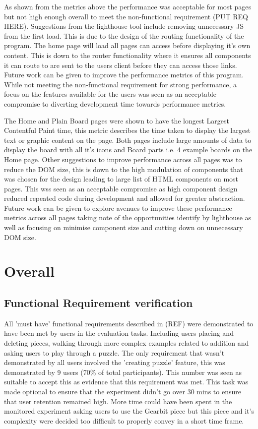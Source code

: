 \documentclass{l4proj}
\begin{document}
As shown from the metrics above the performance was acceptable for most pages but not high enough overall to meet the non-functional requirement (PUT REQ HERE). Suggestions from the lighthouse tool include removing unnecessary JS from the first load. This is due to the design of the routing functionality of the program. The home page will load all pages can access before displaying it's own content. This is down to the router functionality where it ensures all components it can route to are sent to the users client before they can access those links. Future work can be given to improve the performance metrics of this program. While not meeting the non-functional requirement for strong performance, a focus on the features available for the users was seen as an acceptable compromise to diverting development time towards performance metrics. 

The Home and Plain Board pages were shown to have the longest Largest Contentful Paint time, this metric describes the time taken to display the largest text or graphic content on the page. Both pages include large amounts of data to display the board with all it's icons and Board parts i.e. 4 example boards on the Home page. Other suggestions to improve performance across all pages was to reduce the DOM size, this is down to the high modulation of components that was chosen for the design leading to large list of HTML components on most pages. This wss seen as an acceptable compromise as high component design reduced repeated code during development and allowed for greater abstraction. Future work can be given to explore avenues to improve these performance metrics across all pages taking note of the opportunities identify by lighthouse as well as focusing on minimise component size and cutting down on unnecessary DOM size.   

\section{Overall}
\subsection{Functional Requirement verification}

All 'must have' functional requirements described in (REF) were demonstrated to have been met by users in the evaluation tasks. Including users placing and deleting pieces, walking through more complex examples related to addition and asking users to play through a puzzle. The only requirement that wasn't demonstrated by all users involved the 'creating puzzle' feature, this was demonstrated by 9 users (70\% of total participants). This number was seen as suitable to accept this as evidence that this requirement was met. This task was made optional to ensure that the experiment didn't go over 30 mins to ensure that user retention remained high. More time could have been spent in the monitored experiment asking users to use the Gearbit piece but this piece and it's complexity were decided too difficult to properly convey in a short time frame. 
\end{document}
